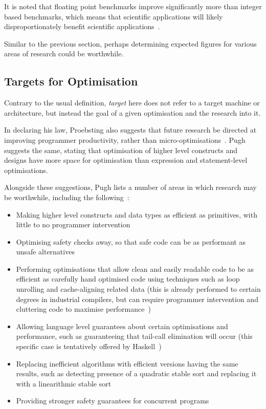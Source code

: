 It is noted that floating point benchmarks improve significantly more than integer based benchmarks, which means that scientific applications will likely disproportionately benefit scientific applications~\cite{proebstingformal}.

Similar to the previous section, perhaps determining expected figures for various areas of research could be worthwhile.

\subsection{Targets for Optimisation}

Contrary to the usual definition, \textit{target} here does not refer to a target machine or architecture, but instead the goal of a given optimisation and the research into it.

In declaring his law, Proebsting also suggests that future research be directed at improving programmer productivity, rather than micro-optimisations~\cite{proebstingdecl}. Pugh suggests the same, stating that optimisation of higher level constructs and designs have more space for optimisation than expression and statement-level optimisations.

Alongside these suggestions, Pugh lists a number of areas in which research may be worthwhile, including the following~\cite{optimisationrelevant}:

\begin{itemize}
	\itemsep-0.25em
	\item Making higher level constructs and data types as efficient as primitives, with little to no programmer intervention
	\item Optimising safety checks away, so that safe code can be as performant as unsafe alternatives
	\item Performing optimisations that allow clean and easily readable code to be as efficient as carefully hand optimised code using techniques such as loop unrolling and cache-aligning related data (this is already performed to certain degrees in industrial compilers, but can require programmer intervention and cluttering code to maximise performance~\cite{gccloops})
	\item Allowing language level guarantees about certain optimisations and performance, such as guaranteeing that tail-call elimination will occur (this specific case is tentatively offered by Haskell~\cite{haskelltail})
	\item Replacing inefficient algorithms with efficient versions having the same results, such as detecting presence of a quadratic stable sort and replacing it with a linearithmic stable sort
	\item Providing stronger safety guarantees for concurrent programs
\end{itemize}

